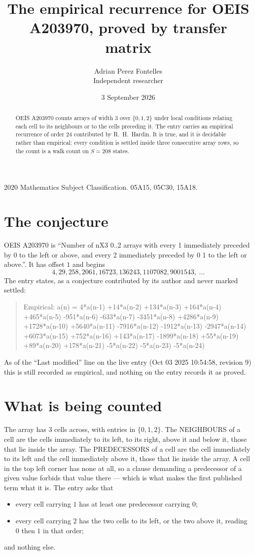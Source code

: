 \documentclass[11pt,a4paper]{article}
\title{The empirical recurrence for OEIS A203970, proved by transfer matrix}
\author{Adrian Perez Fontelles\\ \small Independent researcher}
\date{3 September 2026}
\theoremstyle{plain}
\theoremstyle{definition}
\begin{document}
\maketitle

\begin{abstract}
OEIS A203970 counts arrays of width $3$ over $\{0,1,2\}$ under local conditions relating each cell
to its neighbours or to the cells preceding it. The entry carries an empirical recurrence of
order $24$ contributed by R.~H.~Hardin. It is true, and it is decidable rather than
empirical: every condition is settled inside three consecutive array rows, so the count is a
walk count on $S=208$ states.
\end{abstract}

\noindent\small 2020 Mathematics Subject Classification. 05A15, 05C30, 15A18.\normalsize

\section{The conjecture}

OEIS A203970 is ``Number of nX3 0..2 arrays with every 1 immediately preceded by 0 to the left or above, and every 2 immediately preceded by 0 1 to the left or above.''. It has offset $1$ and begins
\[
4, 29, 258, 2061, 16723, 136243, 1107082, 9001543,\ \dots
\]
The entry states, as a conjecture contributed by its author and never marked settled:
\begin{quote}
Empirical: a(n) = 4*a(n-1) +14*a(n-2) +134*a(n-3) +164*a(n-4) +465*a(n-5) -951*a(n-6) -633*a(n-7) -3451*a(n-8) +4286*a(n-9) +1728*a(n-10) +5640*a(n-11) -7916*a(n-12) -1912*a(n-13) -2947*a(n-14) +6073*a(n-15) +752*a(n-16) +143*a(n-17) -1899*a(n-18) +55*a(n-19) +89*a(n-20) +178*a(n-21) -5*a(n-22) -5*a(n-23) -5*a(n-24)
\end{quote}
As of the ``Last modified'' line on the live entry (Oct 03 2025 10:54:58, revision 9) this is still
recorded as empirical, and nothing on the entry records it as proved.

\section{What is being counted}

The array has $3$ cells across, with entries in $\{0,1,2\}$. The NEIGHBOURS of a cell are the
cells immediately to its left, to its right, above it and below it, those that lie inside the
array. The PREDECESSORS of a cell are the cell immediately to its left and the cell
immediately above it, those that lie inside the array. A cell in the top left corner has none
at all, so a clause demanding a predecessor of a given value forbids that value there --- which
is what makes the first published term what it is. The entry asks that
\begin{itemize}
\item every cell carrying $1$ has at least one predecessor carrying $0$;
\item every cell carrying $2$ has the two cells to its left, or the two above it, reading $0$ then $1$ in that order;
\end{itemize}
and nothing else.
\end{document}
